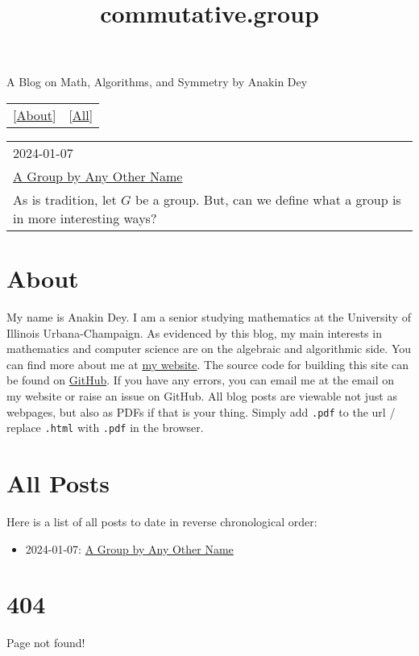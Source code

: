 \documentclass{article}
\title{commutative.group}
\begin{document}
\maketitle
\newline
\begin{center}
  A Blog on Math, Algorithms, and Symmetry by Anakin Dey
\end{center}
\begin{table}
  \centering
  \begin{tabular}{cc}
    \LARGE[\href{About.html}{About}] & \LARGE[\href{All-Posts.html}{All}]
  \end{tabular}
\end{table}

\begin{table}
  \centering
  \begin{tabular}{|l|}
    \hline
    \large 2024-01-07 \\
    \LARGE \href{posts/other_name.html}{A Group by Any Other Name} \\
    As is tradition, let $G$ be a group. But, can we define what a group is in more interesting ways? \\
    \hline
  \end{tabular}
\end{table}

\part*{\centering About}

\newline

My name is Anakin Dey.
I am a senior studying mathematics at the University of Illinois Urbana-Champaign.
As evidenced by this blog, my main interests in mathematics and computer science are on the algebraic and algorithmic side.
You can find more about me at \href{https://www.anakin-dey.com/}{my website}.
The source code for building this site can be found on \href{https://github.com/Spamakin/abel}{GitHub}.
If you have any errors, you can email me at the email on my website or raise an issue on GitHub.
All blog posts are viewable not just as webpages, but also as PDFs if that is your thing.
Simply add \texttt{.pdf} to the url / replace \texttt{.html} with \texttt{.pdf} in the browser.

\part*{\centering All Posts}

\newline

Here is a list of all posts to date in reverse chronological order:

\begin{itemize}
\item 2024-01-07: \href{posts/other_name.html}{A Group by Any Other Name}
\end{itemize}

\part*{404}

\newline

Page not found!
\end{document}
